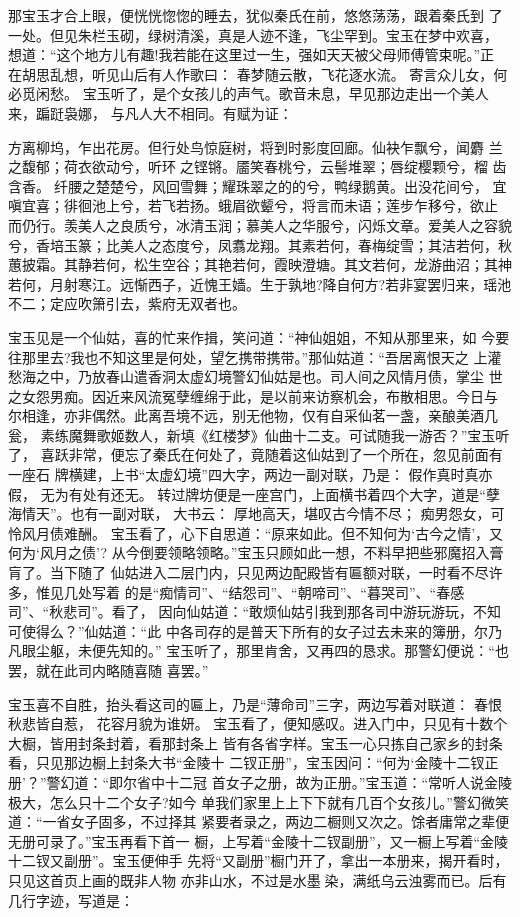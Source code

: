 那宝玉才合上眼，便恍恍惚惚的睡去，犹似秦氏在前，悠悠荡荡，跟着秦氏到
了一处。但见朱栏玉砌，绿树清溪，真是人迹不逢，飞尘罕到。宝玉在梦中欢喜，
想道：“这个地方儿有趣!我若能在这里过一生，强如天天被父母师傅管束呢。”正
在胡思乱想，听见山后有人作歌曰：
春梦随云散，飞花逐水流。
寄言众儿女，何必觅闲愁。
宝玉听了，是个女孩儿的声气。歌音未息，早见那边走出一个美人来，蹁跹袅娜，
与凡人大不相同。有赋为证：

方离柳坞，乍出花房。但行处鸟惊庭树，将到时影度回廊。仙袂乍飘兮，闻麝
兰之馥郁；荷衣欲动兮，听环之铿锵。靥笑春桃兮，云髻堆翠；唇绽樱颗兮，榴
齿含香。纤腰之楚楚兮，风回雪舞；耀珠翠之的的兮，鸭绿鹅黄。出没花间兮，
宜嗔宜喜；徘徊池上兮，若飞若扬。蛾眉欲颦兮，将言而未语；莲步乍移兮，欲止
而仍行。羡美人之良质兮，冰清玉润；慕美人之华服兮，闪烁文章。爱美人之容貌
兮，香培玉篆；比美人之态度兮，凤翥龙翔。其素若何，春梅绽雪；其洁若何，秋
蕙披霜。其静若何，松生空谷；其艳若何，霞映澄塘。其文若何，龙游曲沼；其神
若何，月射寒江。远惭西子，近愧王嫱。生于孰地?降自何方?若非宴罢归来，瑶池
不二；定应吹箫引去，紫府无双者也。

宝玉见是一个仙姑，喜的忙来作揖，笑问道：“神仙姐姐，不知从那里来，如
今要往那里去?我也不知这里是何处，望乞携带携带。”那仙姑道：“吾居离恨天之
上灌愁海之中，乃放春山遣香洞太虚幻境警幻仙姑是也。司人间之风情月债，掌尘
世之女怨男痴。因近来风流冤孽缠绵于此，是以前来访察机会，布散相思。今日与
尔相逢，亦非偶然。此离吾境不远，别无他物，仅有自采仙茗一盏，亲酿美酒几瓮，
素练魔舞歌姬数人，新填《红楼梦》仙曲十二支。可试随我一游否？”宝玉听了，
喜跃非常，便忘了秦氏在何处了，竟随着这仙姑到了一个所在，忽见前面有一座石
牌横建，上书“太虚幻境”四大字，两边一副对联，乃是：
假作真时真亦假，
无为有处有还无。
转过牌坊便是一座宫门，上面横书着四个大字，道是“孽海情天”。也有一副对联，
大书云：
厚地高天，堪叹古今情不尽；
痴男怨女，可怜风月债难酬。
宝玉看了，心下自思道：“原来如此。但不知何为‘古今之情’，又何为‘风月之债’?
从今倒要领略领略。”宝玉只顾如此一想，不料早把些邪魔招入膏肓了。当下随了
仙姑进入二层门内，只见两边配殿皆有匾额对联，一时看不尽许多，惟见几处写着
的是“痴情司”、“结怨司”、“朝啼司”、“暮哭司”、“春感司”、“秋悲司”。看了，
因向仙姑道：“敢烦仙姑引我到那各司中游玩游玩，不知可使得么？”仙姑道：“此
中各司存的是普天下所有的女子过去未来的簿册，尔乃凡眼尘躯，未便先知的。”
宝玉听了，那里肯舍，又再四的恳求。那警幻便说：“也罢，就在此司内略随喜随
喜罢。”

宝玉喜不自胜，抬头看这司的匾上，乃是“薄命司”三字，两边写着对联道：
春恨秋悲皆自惹，
花容月貌为谁妍。
宝玉看了，便知感叹。进入门中，只见有十数个大橱，皆用封条封着，看那封条上
皆有各省字样。宝玉一心只拣自己家乡的封条看，只见那边橱上封条大书“金陵十
二钗正册”，宝玉因问：“何为‘金陵十二钗正册’？”警幻道：“即尔省中十二冠
首女子之册，故为正册。”宝玉道：“常听人说金陵极大，怎么只十二个女子?如今
单我们家里上上下下就有几百个女孩儿。”警幻微笑道：“一省女子固多，不过择其
紧要者录之，两边二橱则又次之。馀者庸常之辈便无册可录了。”宝玉再看下首一
橱，上写着“金陵十二钗副册”，又一橱上写着“金陵十二钗又副册”。宝玉便伸手
先将“又副册”橱门开了，拿出一本册来，揭开看时，只见这首页上画的既非人物
亦非山水，不过是水墨染，满纸乌云浊雾而已。后有几行字迹，写道是：

